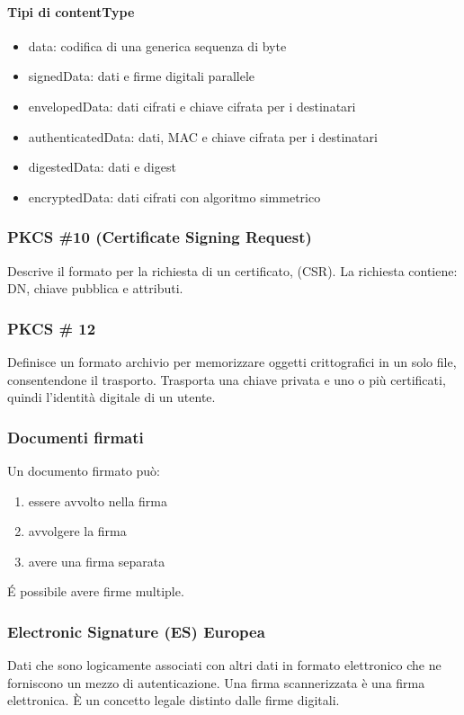 \documentclass[11pt]{article}
\begin{document}
\paragraph*{Tipi di contentType}
\begin{itemize}
    \item data: codifica di una generica sequenza di byte 
    \item signedData: dati e firme digitali parallele 
    \item envelopedData: dati cifrati e chiave cifrata per i destinatari 
    \item authenticatedData: dati, MAC e chiave cifrata per i destinatari 
    \item digestedData: dati e digest 
    \item encryptedData: dati cifrati con algoritmo simmetrico
\end{itemize}
\subsubsection{PKCS \#10 (Certificate Signing Request)}
Descrive il formato per la richiesta di un certificato, (CSR). La richiesta contiene: DN, chiave pubblica e attributi.
\subsubsection{PKCS \# 12}
Definisce un formato archivio per memorizzare oggetti crittografici in un solo file, consentendone il trasporto. Trasporta 
una chiave privata e uno o più certificati, quindi l'identità digitale di un utente.
\subsubsection{Documenti firmati}
Un documento firmato può:
\begin{enumerate}
    \item essere avvolto nella firma
    \item avvolgere la firma 
    \item avere una firma separata 
\end{enumerate}
É possibile avere firme multiple. 
\subsubsection{Electronic Signature (ES) Europea}
Dati che sono logicamente associati con altri dati in formato elettronico che ne forniscono un mezzo di autenticazione.
Una firma scannerizzata è una firma elettronica. È un concetto legale distinto dalle firme digitali.
\end{document}
